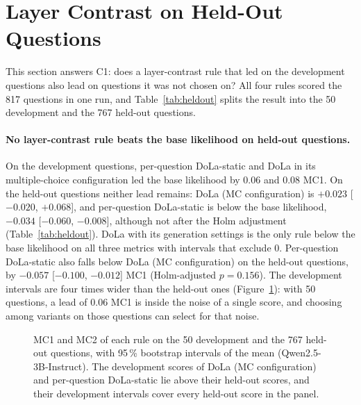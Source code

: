 \documentclass[11pt]{article}
\newcommand{\cha}[1]{\textsf{C#1}}
\newcommand{\method}{per-question DoLa-static}
\newcommand{\Method}{Per-question DoLa-static}
\newcommand{\mainmodel}{Qwen2.5-3B-Instruct}
\begin{document}
\section{Layer Contrast on Held-Out Questions}
\label{sec:heldout}
This section answers \cha1: does a layer-contrast rule that led on the development questions also lead on
questions it was not chosen on? All four rules scored the 817 questions in one run, and Table~\ref{tab:heldout}
splits the result into the 50 development and the 767 held-out questions.

\begin{table}[t]
\centering\small\setlength{\tabcolsep}{3.5pt}
\caption{Layer contrast on the development and held-out questions (\mainmodel{}). The last three columns compare each
rule with the base likelihood on the held-out questions: mean MC1 difference with its 95\,\% paired-bootstrap
interval, questions gained and lost, and the exact McNemar $p$-value, Holm-adjusted over the 20 $p$-values of the
five comparisons of this test family; the other two compare \method{} with each DoLa configuration.}
\label{tab:heldout}
\end{table}

\paragraph{No layer-contrast rule beats the base likelihood on held-out questions.}
On the development questions, \method{} and DoLa in its multiple-choice configuration led the base likelihood by
0.06 and 0.08 MC1. On the held-out questions neither lead remains: DoLa (MC configuration) is $+0.023$ [$-0.020$,
$+0.068$], and \method{} is below the base likelihood, $-0.034$ [$-0.060$, $-0.008$], although not after the Holm
adjustment (Table~\ref{tab:heldout}). DoLa with its generation settings is the only rule below the base likelihood
on all three metrics with intervals that exclude 0. \Method{} also falls below DoLa (MC configuration) on the held-out questions, by
$-0.057$ [$-0.100$, $-0.012$] MC1 (Holm-adjusted $p = 0.156$). The development intervals are four times wider
than the held-out ones (Figure~\ref{fig:heldout}): with 50 questions, a lead of 0.06 MC1 is inside the noise of a
single score, and choosing among variants on those questions can select for that noise.

\begin{figure}[t]
\centering

\caption{MC1 and MC2 of each rule on the 50 development and the 767 held-out questions, with 95\,\% bootstrap
intervals of the mean (\mainmodel{}). The development scores of DoLa (MC configuration) and \method{} lie above
their held-out scores, and their development intervals cover every held-out score in the panel.}
\label{fig:heldout}
\end{figure}
\end{document}
